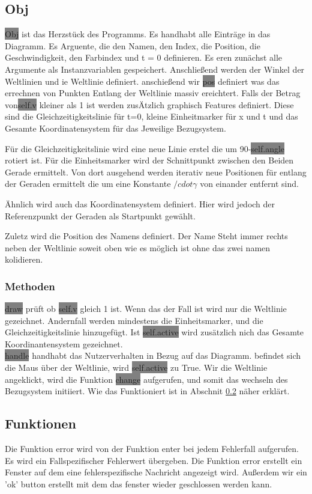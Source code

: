 \documentclass[12pt]{article}
\begin{document}
\subsection{Obj}
\colorbox{gray}{Obj} ist das Herzstück des Programms.
Es handhabt alle Einträge in das Diagramm.
Es Arguente, die den Namen, den Index, die Position, die Geschwindigkeit, den Farbindex und t = 0 definieren.
Es eren zunächst alle Argumente als Instanzvariablen gespeichert.
Anschließend werden der Winkel der Weltlinien und ie Weltlinie definiert.
anschießend wir \colorbox{gray}{pos} definiert was das errechnen von Punkten Entlang der Weltlinie massiv ereichtert.
Falls der Betrag von\colorbox{gray}{self.v} kleiner als 1 ist werden zusÄtzlich graphisch Features definiert.
Diese sind die Gleichzeitigkeitslinie für t=0, kleine Einheitmarker für x und t und das Gesamte Koordinatensystem für das Jeweilige Bezugsystem.

Für die Gleichzeitigkeitslinie wird eine neue Linie erstel die um 90-\colorbox{gray}{self.angle} rotiert ist.
Für die Einheitsmarker wird der Schnittpunkt zwischen den Beiden Gerade ermittelt.
Von dort ausgehend werden iterativ neue Positionen für entlang der Geraden ermittelt die um eine Konstante $/cdot \gamma$ von einander entfernt sind.

Ähnlich wird auch das Koordinatensystem definiert.
Hier wird jedoch der Referenzpunkt der Geraden als Startpunkt gewählt.

Zuletz wird die Position des Namens definiert.
Der Name Steht immer rechts neben der Weltlinie soweit oben wie es möglich ist ohne das zwei namen kolidieren.
\subsubsection{Methoden}
\colorbox{gray}{draw} prüft ob \colorbox{gray}{self.v} gleich 1 ist.
Wenn das der Fall ist wird nur die Weltlinie gezeichnet.
Andernfall werden mindestens die Einheitsmarker, und die Gleichzeitigkeitslinie hinzugefügt.
Ist \colorbox{gray}{self.active} wird zusätzlich nich das Gesamte Koordinantensystem gezeichnet.
\\

\colorbox{gray}{handle} handhabt das Nutzerverhalten in Bezug auf das Diagramm.
befindet sich die Maus über der Weltlinie, wird \colorbox{gray}{self.active} zu True.
Wir die Weltlinie angeklickt, wird die Funktion \colorbox{gray}{change} aufgerufen, und somit das wechseln des Bezugsystem initiiert.
Wie das Funktioniert ist in Abschnit \ref{func} näher erklärt.
\subsection{Funktionen}
\label{func}
Die Funktion error wird von der Funktion enter bei jedem Fehlerfall aufgerufen.
Es wird ein Fallspezifischer Fehlerwert übergeben.
Die Funktion error erstellt ein Fenster auf dem eine fehlerspezifische Nachricht angezeigt wird.
Außerdem wir ein 'ok' button erstellt mit dem das fenster wieder geschlossen werden kann.
\\
\end{document}
